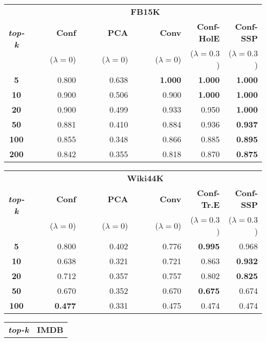 \begin{table}[t]
\centering
\begin{tabular}{|c|r r r r r|} 
 \hline
 \multirow{3}{*}{\textbf{\textit{top-k}}} & \multicolumn{5}{|c|}{\textbf{FB15K}}\\
 \cline{2-6}
 & \textbf{{~~~~~}Conf}&  \textbf{{~~~~~}PCA} & \textbf{{~~~~~}Conv} &\textbf{Conf-HolE}& \textbf{Conf-SSP}\\
  & {\scriptsize($\lambda=0$)} & {\scriptsize($\lambda=0$)} & {\scriptsize($\lambda=0$)} & {\scriptsize($\lambda=0.3$)} & {\scriptsize($\lambda=0.3$)}\\
 \hline
\textbf{5} & 0.800 & 0.638 & \textbf{1.000} & \textbf{1.000} & \textbf{1.000}\\
\textbf{10} & 0.900 & 0.506 & 0.900 & \textbf{1.000} & \textbf{1.000}\\
\textbf{20} & 0.900 & 0.499 & 0.933 & 0.950 & \textbf{1.000}\\
\textbf{50} & 0.881 & 0.410 & 0.884 & 0.936 & \textbf{0.937}\\
\textbf{100} & 0.855 & 0.348 & 0.866 & 0.885 & \textbf{0.895}\\
\textbf{200} & 0.842 & 0.355 & 0.818 & 0.870 & \textbf{0.875}\\
 \hline
\end{tabular}
\begin{tabular}{|c|r r r r r|} 
 \hline
 \multirow{3}{*}{\textbf{\textit{top-k}}} & \multicolumn{5}{|c|}{\textbf{Wiki44K}}\\
 \cline{2-6}
 & \textbf{{~~~~~}Conf}&  \textbf{{~~~~~}PCA} & \textbf{{~~~~~}Conv} &\textbf{{~}Conf-Tr.E}& \textbf{Conf-SSP}\\
  & {\scriptsize($\lambda=0$)} & {\scriptsize($\lambda=0$)} & {\scriptsize($\lambda=0$)} & {\scriptsize($\lambda=0.3$)} & {\scriptsize($\lambda=0.3$)}\\
 \hline
 \textbf{5} & 0.800 & 0.402 & 0.776 & \textbf{0.995} & 0.968 \\
\textbf{10} & 0.638 & 0.321 & 0.721 & 0.863 & \textbf{0.932} \\
\textbf{20} & 0.712 & 0.357 & 0.757 & 0.802 & \textbf{0.825} \\
\textbf{50} & 0.670 & 0.352 & 0.670 & \textbf{0.675} & 0.674 \\
\textbf{100} & \textbf{0.477} & 0.331 & 0.475 & 0.474 & 0.474\\
 \hline
\end{tabular}
\begin{tabular}{|c|r r r r|} 
 \hline
 \multirow{3}{*}{\textbf{\textit{top-k}}} & \multicolumn{4}{|c|}{\textbf{IMDB}}\\

\end{tabular}
\end{table}

